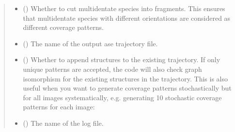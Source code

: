 \documentclass[letterpaper,10pt,english]{sphinxmanual}
\begin{document}
\begin{fulllineitems}
\begin{quote}
\begin{description}
\begin{itemize}
\item {} 
 (\sphinxstyleliteralemphasis{\sphinxupquote{, }}) \textendash{} Whether to cut multidentate species into fragments. This ensures
that multidentate species with different orientations are
considered as different coverage patterns.

\item {} 
 (\sphinxstyleliteralemphasis{\sphinxupquote{, }}) \textendash{} The name of the output ase trajectory file.

\item {} 
 (\sphinxstyleliteralemphasis{\sphinxupquote{, }}) \textendash{} 
Whether to append structures to the existing trajectory.
If only unique patterns are accepted, the code will also check
graph isomorphism for the existing structures in the trajectory.
This is also useful when you want to generate coverage patterns
stochastically but for all images systematically, e.g. generating
10 stochastic coverage patterns for each image:

\begin{sphinxVerbatim}[commandchars=\\\{\}]
     
   
       
     
\end{sphinxVerbatim}


\item {} 
 (\sphinxstyleliteralemphasis{\sphinxupquote{, }}) \textendash{} The name of the log file.


\end{itemize}
\end{description}
\end{quote}
\end{fulllineitems}
\end{document}

